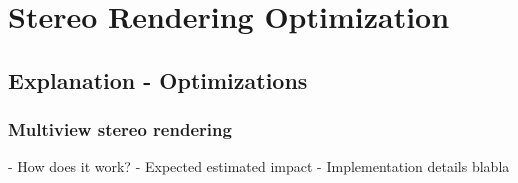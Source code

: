 
\chapter{Stereo Rendering Optimization}

\section{Explanation - Optimizations}
\subsection{Multiview stereo rendering}
- How does it work? 
- Expected estimated impact 
- Implementation details 
blabla